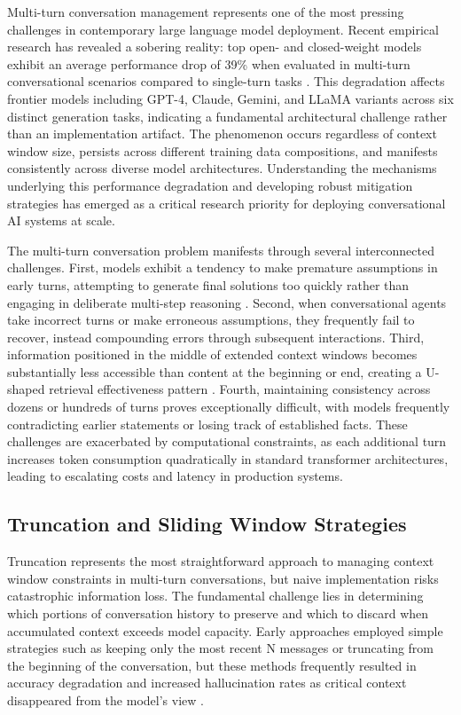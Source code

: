 Multi-turn conversation management represents one of the most pressing challenges in contemporary large language model deployment. Recent empirical research has revealed a sobering reality: top open- and closed-weight models exhibit an average performance drop of 39\% when evaluated in multi-turn conversational scenarios compared to single-turn tasks \citep{wang2025survey}. This degradation affects frontier models including GPT-4, Claude, Gemini, and LLaMA variants across six distinct generation tasks, indicating a fundamental architectural challenge rather than an implementation artifact. The phenomenon occurs regardless of context window size, persists across different training data compositions, and manifests consistently across diverse model architectures. Understanding the mechanisms underlying this performance degradation and developing robust mitigation strategies has emerged as a critical research priority for deploying conversational AI systems at scale.

The multi-turn conversation problem manifests through several interconnected challenges. First, models exhibit a tendency to make premature assumptions in early turns, attempting to generate final solutions too quickly rather than engaging in deliberate multi-step reasoning \citep{wang2025survey}. Second, when conversational agents take incorrect turns or make erroneous assumptions, they frequently fail to recover, instead compounding errors through subsequent interactions. Third, information positioned in the middle of extended context windows becomes substantially less accessible than content at the beginning or end, creating a U-shaped retrieval effectiveness pattern \citep{liu2024lost}. Fourth, maintaining consistency across dozens or hundreds of turns proves exceptionally difficult, with models frequently contradicting earlier statements or losing track of established facts. These challenges are exacerbated by computational constraints, as each additional turn increases token consumption quadratically in standard transformer architectures, leading to escalating costs and latency in production systems.

\subsection{Truncation and Sliding Window Strategies}

Truncation represents the most straightforward approach to managing context window constraints in multi-turn conversations, but naive implementation risks catastrophic information loss. The fundamental challenge lies in determining which portions of conversation history to preserve and which to discard when accumulated context exceeds model capacity. Early approaches employed simple strategies such as keeping only the most recent N messages or truncating from the beginning of the conversation, but these methods frequently resulted in accuracy degradation and increased hallucination rates as critical context disappeared from the model's view \citep{greyling2024context}.

